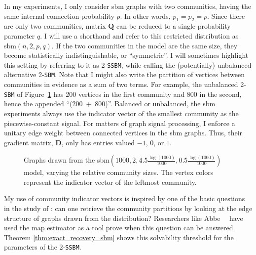 In my experiments, I only consider \acrshort{sbm} graphs with two communities, having the same internal connection probability $p$. In other words, $p_1 = p_2 = p$. Since there are only two communities, matrix $\mathbf{Q}$ can be reduced to a single probability parameter $q$. I will use a shorthand and refer to this restricted distribution as \acrshort{sbm}$(n, 2, p, q)$. If the two communities in the model are the same size, they become statistically indistinguishable, or ``symmetric''. I will sometimes highlight this setting by referring to it as 2-\texttt{SSBM}, while calling the (potentially) unbalanced alternative 2-\texttt{SBM}. Note that I might also write the partition of vertices between communities in evidence as a sum of two terms. For example, the unbalanced 2-\texttt{SBM} of Figure~\ref{fig:2ssbm_and_2sbm} has 200 vertices in the first community and 800 in the second, hence the appended ``(200~+~800)''. Balanced or unbalanced, the \acrshort{sbm} experiments always use the indicator vector of the smallest community as the piecewise-constant signal. For matters of graph signal processing, I enforce a unitary edge weight between connected vertices in the \acrshort{sbm} graphs. Thus, their gradient matrix, $\mathbf{D}$, only has entries valued $-1$, $0$, or $1$.

\begin{figure}[H]
    \centering
    \hfill
    \caption[Graphs from 2-\texttt{SSBM}(500~+~500) and 2-\texttt{SBM}(200~+~800)]{Graphs drawn from the \acrshort{sbm}$\left(1000, 2, 4.5 \frac{\log (1000)}{1000}, 0.5 \frac{\log (1000)}{1000}\right)$ model, varying the relative community sizes. The vertex colors represent the indicator vector of the leftmost community.}
    \label{fig:2ssbm_and_2sbm}
\end{figure}

My use of community indicator vectors is inspired by one of the basic questions in the study of : can one retrieve the community partitions by looking at the edge structure of graphs drawn from the distribution? Researchers like Abbe~\etal~\cite{abbe2015, abbe2018} have used the \acrfull{map} estimator as a tool prove when this question can be answered. Theorem \ref{thm:exact_recovery_sbm} shows this solvability threshold for the parameters of the 2-\texttt{SSBM}.

\clearpage

